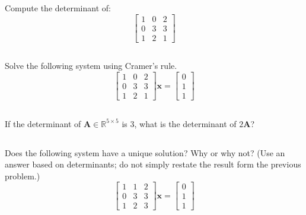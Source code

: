 \documentclass[letterpaper, 11pt]{article}
\begin{document}
\subsection{} Compute the determinant of:
\[  \left[ \begin{array}{ccc} 1 & 0 & 2 \\ 0 & 3 & 3 \\ 1 & 2 & 1 \end{array}   \right] \]
\subsection{} Solve the following system using Cramer's rule. 
\[ \left[ \begin{array}{ccc} 1 & 0 & 2 \\ 0 & 3 & 3 \\ 1 & 2 & 1 \end{array}   \right] \mathbf{x} = \left[ \begin{array}{c} 0 \\ 1 \\ 1 \end{array} \right] \]

\subsection{} If the determinant of $\bm{A} \in \mathbb{R}^{5 \times 5} $ is 3, what is the determinant of $2 \mathbf{A}$?

\subsection{} Does the following system have a unique solution? Why or why not? (Use an answer based on determinants; do not simply restate the result form the previous problem.)
\[ \left[ \begin{array}{ccc} 1 & 1 & 2 \\ 0 & 3 & 3 \\ 1 & 2 & 3 \end{array}   \right] \mathbf{x} = \left[ \begin{array}{c} 0 \\ 1 \\ 1 \end{array} \right] \]
\end{document}
